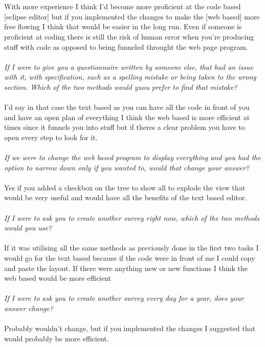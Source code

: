 \documentclass{report}
\begin{document}
\\
\\
With more experience I think I'd become more proficient at the code based [eclipse editor] but if you implemented the changes to make the [web based] more free flowing I think that would be easier in the long run. Even if someone is proficient at coding there is still the risk of human error when you're producing stuff with code as opposed to being funneled throught the web page program.
\\
\\
\textit{If I were to give you a questionnaire written by someone else, that had an issue with it, with specification, such as a spelling mistake or being taken to the wrong section. Which of the two methods would yuou prefer to find that mistake?}
\\
\\
I'd say in that case the text based as you can have all the code in front of you and have an open plan of everything I think the web based is more efficient at times since it funnels you into stuff but if theres a clear problem you have to open every step to look for it.
\\
\\
\textit{If we were to change the web based program to display everything and you had the option to narrow down only if you wanted to, would that change your answer?}
\\
\\
Yes if you added a checkbox on the tree to show all to explode the view that would be very useful and would have all the benefits of the text based editor.
\\
\\
\textit{If I were to ask you to create another survey right now, which of the two methods would you use?}
\\
\\
If it was utilising all the same methods as previously done in the first two tasks I would go for the text based because if the code were in front of me I could copy and paste the layout. If there were anything new or new functions I think the web based would be more efficient
\\
\\
\textit{If I were to ask you to create another survey every day for a year, does your answer change?}
\\
\\
Probably wouldn't change, but if you implemented the changes I suggested that would probably be more efficient.
\end{document}
